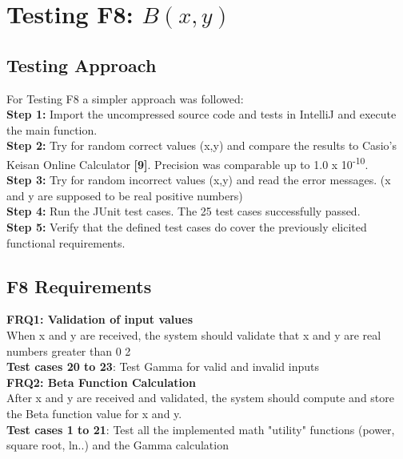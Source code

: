\documentclass[12pt]{extarticle}
\newcommand{\<}{\langle}
\renewcommand{\>}{\rangle}
\theoremstyle{definition}
\begin{document}
\section{Testing F8: \(B(x, y)\)}

\subsection{Testing Approach}

For Testing F8 a simpler approach was followed: \\

\noindent\textbf{Step 1:} Import the uncompressed source code and tests in IntelliJ and execute the main function. \\

\noindent\textbf{Step 2:} Try for random correct values (x,y) and compare the results to Casio's Keisan Online Calculator \textbf{[9]}. Precision was comparable up to 1.0 x 10\textsuperscript{-10}. \\

\noindent\textbf{Step 3:} Try for random incorrect values (x,y) and read the error messages. (x and y are supposed to be real positive numbers) \\

\noindent\textbf{Step 4:} Run the JUnit test cases. The 25 test cases successfully passed.\\

\noindent\textbf{Step 5:} Verify that the defined test cases do cover the previously elicited functional requirements.



\subsection{F8 Requirements}

\noindent\textbf{FRQ1: Validation of input values}\\
When x and y are received, the system should validate that x and y are real numbers greater than 0
2\\
\textbf{Test cases 20 to 23}: Test Gamma for valid and invalid inputs\\

\noindent\textbf{FRQ2: Beta Function Calculation}\\
After x and y are received and validated, the system should compute and store the Beta function value for
x and y.\\
\textbf{Test cases 1 to 21}: Test all the implemented math "utility" functions (power, square root, ln..) and the Gamma calculation\\
\end{document}
